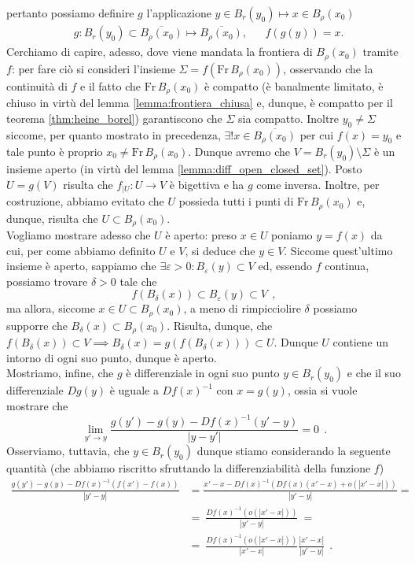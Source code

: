 	pertanto possiamo definire $g$ l'applicazione $y \in B_{r}(y_0) \mapsto x \in B_{\rho}(x_0)$
	\[\begin{aligned}
		&g: B_{r}(y_0) \subset \overline{B_{\rho} (x_0)} \mapsto \overline{B_\rho(x_0)}, & &f(g(y)) = x.
    \end{aligned}\]
	Cerchiamo di capire, adesso, dove viene mandata la frontiera di $B_\rho(x_0)$ tramite $f$: per fare ciò si consideri l'insieme $\Sigma = f(\text{Fr} \, B_\rho(x_0))$, osservando che la continuità di $f$ e il fatto che $\text{Fr} \, B_\rho(x_0)$ è compatto (è banalmente limitato, è chiuso in virtù del lemma \ref{lemma:frontiera_chiusa} e, dunque, è compatto per il teorema \ref{thm:heine_borel}) garantiscono che $\Sigma$ sia compatto. Inoltre
    $y_0 \neq \Sigma$ siccome, per quanto mostrato in precedenza, $\exists ! x \in \overline{B_\rho(x_0)}$ per cui $f(x) = y_0$ e tale punto è proprio $x_0 \neq \text{Fr} \, B_\rho(x_0)$. Dunque avremo che $V = B_r(y_0) \setminus \Sigma$ è un insieme aperto (in virtù del lemma \ref{lemma:diff_open_closed_set}). Posto $U = g(V)$ risulta che $f_{|U} : U \to V$ è bigettiva
    e ha $g$ come inversa. Inoltre, per costruzione, abbiamo evitato che $U$ possieda tutti i punti di $\text{Fr} \, B_\rho(x_0)$ e, dunque, risulta che $U \subset B_\rho(x_0)$. \\
    Vogliamo mostrare adesso che $U$ è aperto: preso $x \in U$ poniamo $y = f(x)$ da cui, per come abbiamo definito $U$ e $V$, si deduce che $y \in V$. Siccome quest'ultimo insieme è aperto, sappiamo che $\exists \varepsilon > 0: B_\varepsilon(y) \subset V$ ed, essendo $f$ continua, possiamo trovare $\delta > 0$ tale che
    \[f(B_\delta(x)) \subset B_\varepsilon(y) \subset V\ \ , \]
    ma allora, siccome $x \in U \subset B_\rho(x_0)$, a meno di rimpicciolire $\delta$ possiamo supporre che $B_\delta(x) \subset B_\rho(x_0)$. Risulta, dunque, che $f(B_\delta(x)) \subset V \implies B_\delta(x) = g(f(B_\delta(x))) \subset U$. Dunque $U$ contiene un intorno di ogni suo punto, dunque è aperto. \\
    Mostriamo, infine, che $g$ è differenziale in ogni suo punto $y \in B_r(y_0)$ e che il suo differenziale $Dg(y)$ è uguale a $Df(x)^{-1}$ con $x = g(y)$, ossia si vuole mostrare che
    \[\lim_{y' \to y} \frac{g(y') - g(y) - Df(x)^{-1}(y'-y)}{|y-y'|} = 0\ \ .\]
    Osserviamo, tuttavia, che $y \in B_r(y_0)$ dunque stiamo considerando la seguente quantità (che abbiamo riscritto sfruttando la differenziabilità della funzione $f$)
    \[\begin{aligned}
    \frac{g(y') - g(y) - Df(x)^{-1}(f(x')-f(x))}{|y' - y|} 
    &= \frac{x' - x - Df(x)^{-1}(Df(x)(x'-x) + o(|x' - x|))}{|y' - y|} = \\
    &=\ \frac{Df(x)^{-1}(o(|x'-x|))}{|y'-y|}\ =\\
    &=\  \frac{Df(x)^{-1}(o(|x'-x|))}{|x'-x|} \frac{|x'-x|}{|y'-y|}\ \ .
    \end{aligned}\]
